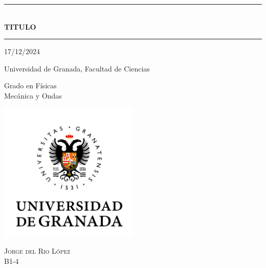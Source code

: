 \documentclass[10pt,onecolumn]{article}
\begin{document}
\renewcommand{\headrulewidth}{0.5pt}
\newcommand{\HRule}[1]{\rule{\linewidth}{#1}}
\renewcommand{\refname}{Bibliography}
\renewcommand{\tablename}{Table}
\renewcommand{\contentsname}{Index}
\renewcommand{\figurename}{Fig.}

\onecolumn
\begin{titlepage}
\centering
    {\HRule{2 pt}} \\
    \vspace{0.5cm}
    {\scshape\Huge {\textbf{TITULO}  }}  \\
    \vspace{1 mm}
    
    {\HRule{2 pt}}

    \vspace{1cm}
    \Large 17/12/2024 \\
    \vspace{1cm}
 
    \normalfont\Large Universidad de Granada, Facultad de Ciencias \\
    \vspace{0.5cm}
    
    
     \normalfont\Large Grado en Físicas \\
    \vspace{0.5cm}
     \normalfont Mecánica y Ondas \\
    \vspace{1.5cm}

\centering
    {\includegraphics[width=0.5\textwidth]{UGR-MARCA-01-color.jpg}\par}

\vfill
    \vspace{1cm}
    \scshape\Large Jorge del Rio López\\
    
    \vspace{0.5cm}
    \scshape\Large B1-4

\vfill

\end{titlepage}
\end{document}
